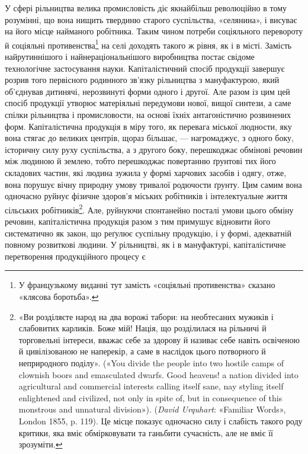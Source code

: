 У сфері рільництва велика промисловість діє якнайбільш
революційно в тому розумінні, що вона нищить твердиню старого
суспільства, «селянина», і висуває на його місце найманого робітника.
Таким чином потреби соціяльного перевороту й соціяльні
противенства\footnote*{
У французькому виданні тут замість «соціяльні противенства»
сказано «клясова боротьба». 
} на селі доходять такого ж рівня, як і в місті.
Замість найрутиннішого і найнераціональнішого виробництва
постає свідоме технологічне застосування науки. Капіталістичний
спосіб продукції завершує розрив того первісного родинного
зв’язку рільництва з мануфактурою, який об’єднував дитинячі,
нерозвинуті форми одного і другої. Але разом із цим цей спосіб
продукції утворює матеріяльні передумови нової, вищої
синтези, а саме спілки рільництва і промисловости, на основі
їхніх антагоністично розвинених форм. Капіталістична продукція
в міру того, як перевага міської людности, яку вона стягає до
великих центрів, щораз більшає, — нагромаджує, з одного боку,
історичну силу руху суспільства, а з другого боку, перешкоджає
обмінові речовин між людиною й землею, тобто перешкоджає
повертанню ґрунтові тих його складових частин, які людина
зужила у формі харчових засобів і одягу, отже, вона порушує
вічну природну умову тривалої родючости ґрунту. Цим самим
вона одночасно руйнує фізичне здоров’я міських робітників і
інтелектуальне життя сільських робітників\footnote{
«Ви розділяєте народ на два ворожі табори: на необтесаних мужиків
і слабовитих карликів. Боже мій! Нація, що розділилася на рільничі
й торговельні інтереси, вважає себе за здорову й називає себе
навіть освіченою й цивілізованою не наперекір, а саме в наслідок цього
потворного й неприродного поділу». («You divide the people into two
hostile camps of clownish boors and emasculated dwarfs. Good heavens!
a nation divided into agricultural and commercial interests calling itself
sane, nay styling itself enlightened and civilized, not only in spite of,
but in consequence of this monstrous and unnatural division»). (\emph{David
Urquhart}: «Familiar Words», London 1855, p. 119). Це місце показує
одночасно силу і слабість такого роду критики, яка вміє обмірковувати
та ганьбити сучасність, але не вміє її зрозуміти.
}.  Але, руйнуючи
спонтанейно посталі умови цього обміну речовин, капіталістична
продукція разом з тим примушує відновити його систематично
як закон, що реґулює суспільну продукцію, і у формі, адекватній
повному розвиткові людини. У рільництві, як і в мануфактурі,
капіталістичне перетворення продукційного процесу є

